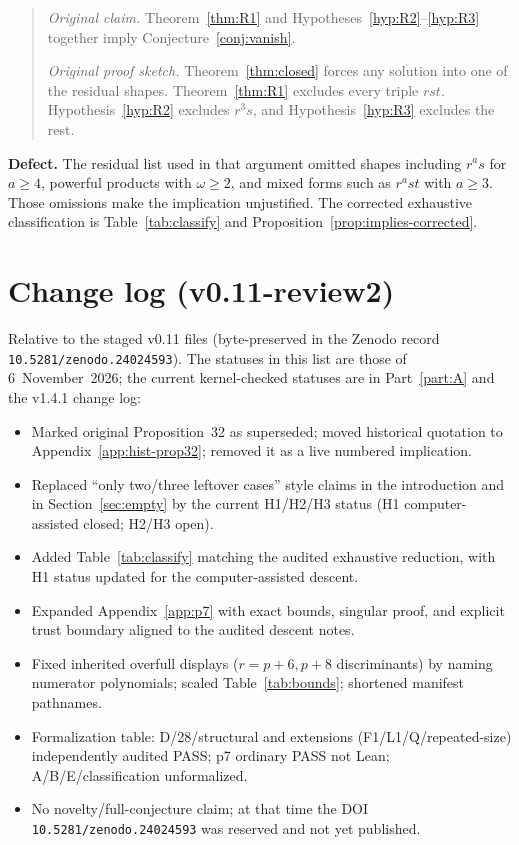 \documentclass[11pt,reqno]{amsart}
\theoremstyle{definition}
\begin{document}
\begin{quote}
\textit{Original claim.} Theorem~\ref{thm:R1} and Hypotheses~\ref{hyp:R2}--\ref{hyp:R3} together imply Conjecture~\ref{conj:vanish}.

\textit{Original proof sketch.} Theorem~\ref{thm:closed} forces any solution into one of the residual shapes. Theorem~\ref{thm:R1} excludes every triple \(rst\). Hypothesis~\ref{hyp:R2} excludes \(r^3s\), and Hypothesis~\ref{hyp:R3} excludes the rest.
\end{quote}

\textbf{Defect.} The residual list used in that argument omitted shapes including \(r^as\) for \(a\ge 4\), powerful products with \(\omega\ge 2\), and mixed forms such as \(r^ast\) with \(a\ge 3\). Those omissions make the implication unjustified. The corrected exhaustive classification is Table~\ref{tab:classify} and Proposition~\ref{prop:implies-corrected}.

\section{Change log (v0.11-review2)}
\label{app:changelog}

Relative to the staged v0.11 files (byte-preserved in the Zenodo record \texttt{10.5281/zenodo.24024593}). The statuses in this list are those of 6~November~2026; the current kernel-checked statuses are in Part~\ref{part:A} and the v1.4.1 change log:
\begin{itemize}
\item Marked original Proposition~32 as superseded; moved historical quotation to Appendix~\ref{app:hist-prop32}; removed it as a live numbered implication.
\item Replaced ``only two/three leftover cases'' style claims in the introduction and in Section~\ref{sec:empty} by the current H1/H2/H3 status (H1 computer-assisted closed; H2/H3 open).
\item Added Table~\ref{tab:classify} matching the audited exhaustive reduction, with H1 status updated for the computer-assisted descent.
\item Expanded Appendix~\ref{app:p7} with exact bounds, singular proof, and explicit trust boundary aligned to the audited descent notes.
\item Fixed inherited overfull displays (\(r=p+6,p+8\) discriminants) by naming numerator polynomials; scaled Table~\ref{tab:bounds}; shortened manifest pathnames.
\item Formalization table: D/28/structural and extensions (F1/L1/Q/repeated-size) independently audited PASS; p7 ordinary PASS not Lean; A/B/E/classification unformalized.
\item No novelty/full-conjecture claim; at that time the DOI \texttt{10.5281/zenodo.24024593} was reserved and not yet published.
\end{itemize}
\end{document}
